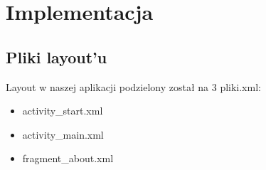 	\newpage
\section{Implementacja}		%
\subsection{Pliki layout'u}
\hspace{0.60cm}Layout w naszej aplikacji podzielony został na 3 pliki.xml:
\begin{itemize}
	\item activity\_start.xml
	\item activity\_main.xml
	\item fragment\_about.xml
\end{itemize}

